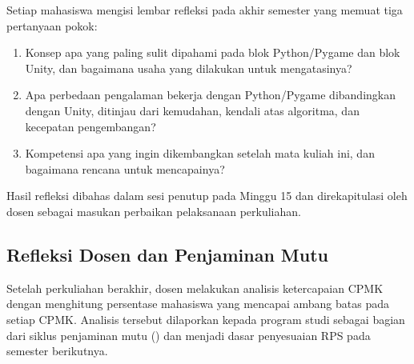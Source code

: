 Setiap mahasiswa mengisi lembar refleksi pada akhir semester yang memuat tiga
pertanyaan pokok:

\begin{enumerate}
  \item Konsep apa yang paling sulit dipahami pada blok Python/Pygame dan blok
        Unity, dan bagaimana usaha yang dilakukan untuk mengatasinya?
  \item Apa perbedaan pengalaman bekerja dengan Python/Pygame dibandingkan
        dengan Unity, ditinjau dari kemudahan, kendali atas algoritma, dan
        kecepatan pengembangan?
  \item Kompetensi apa yang ingin dikembangkan setelah mata kuliah ini, dan
        bagaimana rencana untuk mencapainya?
\end{enumerate}

Hasil refleksi dibahas dalam sesi penutup pada Minggu 15 dan direkapitulasi
oleh dosen sebagai masukan perbaikan pelaksanaan perkuliahan.

\subsection{Refleksi Dosen dan Penjaminan Mutu}

Setelah perkuliahan berakhir, dosen melakukan analisis ketercapaian CPMK
dengan menghitung persentase mahasiswa yang mencapai ambang batas pada setiap
CPMK. Analisis tersebut dilaporkan kepada program studi sebagai bagian dari
siklus penjaminan mutu () dan menjadi dasar
penyesuaian RPS pada semester berikutnya.

